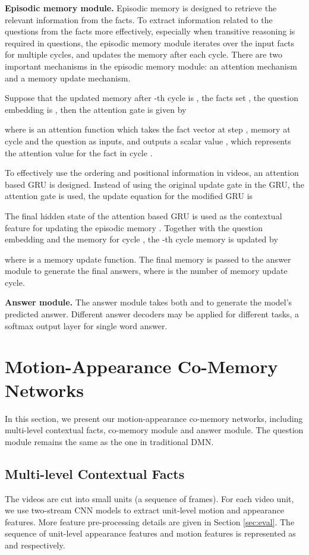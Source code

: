 \documentclass[10pt,twocolumn,letterpaper]{article}
\begin{document}
\textbf{Episodic memory module.} Episodic memory is designed to retrieve the relevant information from the facts. To extract information related to the questions from the facts more effectively, especially when transitive reasoning is required in questions, the episodic memory module iterates over the input facts for multiple cycles, and updates the memory after each cycle. There are two important mechanisms in the episodic memory module: an attention mechanism and a memory update mechanism. 

Suppose that the updated memory after -th cycle is , the facts set , the question embedding is , then the attention gate  is given by

    
where  is an attention function which takes the fact vector  at step , memory  at cycle  and the question  as inputs, and outputs a scalar value , which represents the attention value for the fact  in cycle .

To effectively use the ordering and positional information in videos, an attention based GRU is designed. Instead of using the original update gate in the GRU, the attention gate  is used, the update equation for the modified GRU is 

The final hidden state of the attention based GRU is used as the contextual feature  for updating the episodic memory . Together with the question embedding  and the memory for cycle , the -th cycle memory is updated by 

where  is a memory update function. The final memory  is passed to the answer module to generate the final answers, where  is the number of memory update cycle.

\textbf{Answer module.} The answer module takes both  and  to generate the model’s predicted answer. Different answer decoders may be applied for different tasks, \eg a softmax output layer for single word answer.

\section{Motion-Appearance Co-Memory Networks}

\label{sec:method}
In this section, we present our motion-appearance co-memory networks, including multi-level contextual facts,  co-memory module and answer module. The question module remains the same as the one in traditional DMN.

\subsection{Multi-level Contextual Facts}
\label{sec:facts}
The videos are cut into small units \cite{Gao_2017_ICCV_TURN} (a sequence of frames). For each video unit, we use two-stream CNN models \cite{xiong2016cuhk} to extract unit-level motion and appearance features. More feature pre-processing details are given in Section \ref{sec:eval}. The sequence of unit-level appearance features and motion features is represented as  and  respectively. 
\end{document}

